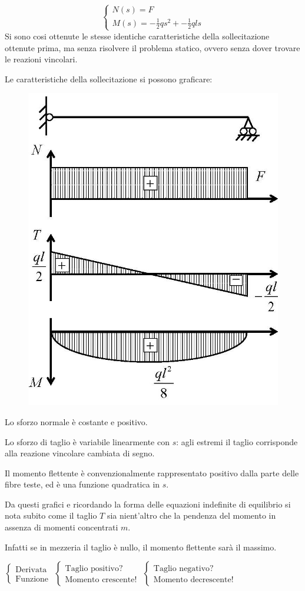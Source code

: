 \documentclass{article}
\begin{document}
\begin{adjustwidth}{2in}{}
\[\begin{cases}
	N(s) = F \\
	
	M(s) = -\frac{1}{2}qs^2 + -\frac{1}{2}qls
	\end{cases}
	\]
	Si sono cosi ottenute le stesse identiche caratteristiche della sollecitazione ottenute prima, ma senza risolvere il problema statico, ovvero senza dover trovare le reazioni vincolari. \newline
	
	Le caratteristiche della sollecitazione si possono graficare:
	
\begin{figure}[H]
	\centering
	\includegraphics[width=0.3\linewidth]{"immagini/1.PARTE5_Pagina_13"}
\end{figure}

	Lo sforzo normale è costante e positivo. \newline 
	
	Lo sforzo di taglio è variabile linearmente con $s$: agli estremi il taglio corrisponde alla reazione vincolare cambiata di segno. \newline 
	
	Il momento flettente è convenzionalmente rappresentato positivo dalla parte delle fibre teste, ed è una funzione quadratica in $s$.
	
	Da questi grafici e ricordando la forma delle equazioni indefinite di equilibrio si nota subito come il taglio $T$ sia nient'altro che la pendenza del momento in assenza di momenti concentrati $m$.
	 
	Infatti se in mezzeria il taglio è nullo, il momento flettente sarà il massimo. \newline
	
	\mbox{$
		\begin{cases}
			\text{Derivata} \\
			\text{Funzione}
		\end{cases}$} \hspace{1cm} \mbox{$
	\begin{cases}
	\text{Taglio positivo?} \\
	\text{Momento crescente!}
\end{cases}$} \hspace{1cm} \mbox{$
\begin{cases}
\text{Taglio negativo?} \\
\text{Momento decrescente!}
\end{cases}$} \newline
	

\end{adjustwidth}
\end{document}
